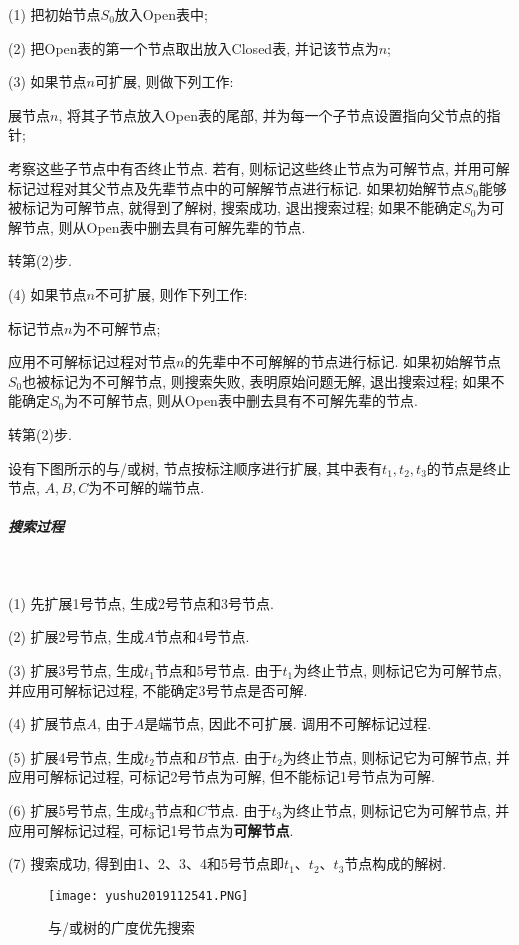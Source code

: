 (1) 把初始节点$S_0$放入Open表中;

(2) 把Open表的第一个节点取出放入Closed表, 并记该节点为$n$;

(3) 如果节点$n$可扩展, 则做下列工作:

      展节点$n$, 将其子节点放入Open表的尾部, 并为每一个子节点设置指向父节点的指针;

       考察这些子节点中有否终止节点. 若有, 则标记这些终止节点为可解节点, 并用可解标记过程对其父节点及先辈节点中的可解解节点进行标记. 如果初始解节点$S_0$能够被标记为可解节点, 就得到了解树, 搜索成功, 退出搜索过程;
        如果不能确定$S_0$为可解节点, 则从Open表中删去具有可解先辈的节点.

      转第(2)步.

(4) 如果节点$n$不可扩展, 则作下列工作:

     标记节点$n$为不可解节点;

     应用不可解标记过程对节点$n$的先辈中不可解解的节点进行标记. 如果初始解节点$S_0$也被标记为不可解节点, 则搜索失败, 表明原始问题无解, 退出搜索过程; 如果不能确定$S_0$为不可解节点, 则从Open表中删去具有不可解先辈的节点.

     转第(2)步.
\begin{example}
  设有下图所示的与/或树, 节点按标注顺序进行扩展, 其中表有$t_1,t_2,t_3$的节点是终止节点, $A,B,C$为不可解的端节点.
\end{example}
\subparagraph{搜索过程}~{}

(1) 先扩展1号节点, 生成2号节点和3号节点.

(2) 扩展2号节点, 生成$A$节点和4号节点.

(3) 扩展3号节点, 生成$t_1$节点和5号节点. 由于$t_1$为终止节点, 则标记它为可解节点, 并应用可解标记过程, 不能确定3号节点是否可解.

(4)  扩展节点$A$, 由于$A$是端节点, 因此不可扩展. 调用不可解标记过程.

(5) 扩展4号节点, 生成$t_2$节点和$B$节点. 由于$t_2$为终止节点, 则标记它为可解节点, 并应用可解标记过程, 可标记2号节点为可解, 但不能标记1号节点为可解.

(6) 扩展5号节点, 生成$t_3$节点和$C$节点. 由于$t_3$为终止节点, 则标记它为可解节点, 并应用可解标记过程, 可标记1号节点为\textbf{可解节点}.

(7) 搜索成功, 得到由1、2、3、4和5号节点即$t_1$、$t_2$、$t_3$节点构成的解树.
\begin{figure}[H]
\centering
\texttt{[image: yushu2019112541.PNG]}
\caption{与/或树的广度优先搜索}
\label{AI32fig41}
\end{figure}
